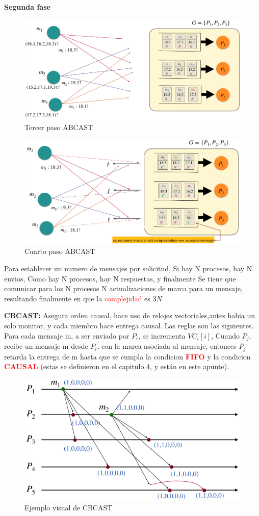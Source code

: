 \textbf{Segunda fase}

\begin{figure}[H]
    \centering
    \includegraphics[width=0.7\linewidth]{img/Tercer_paso.png}
    \caption{Tercer paso ABCAST}\label{fig:1761653161267}
\end{figure}

\begin{figure}[H]
    \centering
    \includegraphics[width=0.7\linewidth]{img/Cuarto_paso.png}
    \caption{Cuarto paso ABCAST}\label{fig:1761653182730}
\end{figure}

Para establecer un numero de mensajes por solicitud, Si hay N procesos, hay N envios, Como hay N procesos, hay N respuestas, y finalmente Se tiene que comunicar para los N procesos N actualizaciones de marca para un mensaje, resultando finalmente en que la \textcolor{red}{complejidad} es $3N$


\textbf{CBCAST:} Asegura orden causal, hace uso de relojes vectoriales,antes habia un solo monitor, y cada miembro hace entrega causal. Las reglas son las siguientes. Para cada mensaje m, a ser enviado por $P_i$, se incrementa $VC_i[i]$, Cuando $P_j$,  recibe un mensaje m desde $P_i$, con la marca asociada al mensaje, entonces $P_j$ retarda la entrega de m hasta que se cumpla la condicion \textcolor{red}{\textbf{FIFO}} y la condicion \textcolor{red}{\textbf{CAUSAL}} (estas se definieron en el capitulo 4, y están en este apunte).

\begin{figure}[H]
    \centering
    \includegraphics[width=0.7\linewidth]{img/CBCAST.png}
    \caption{Ejemplo visual de CBCAST}\label{fig:1761675486364}
\end{figure}

